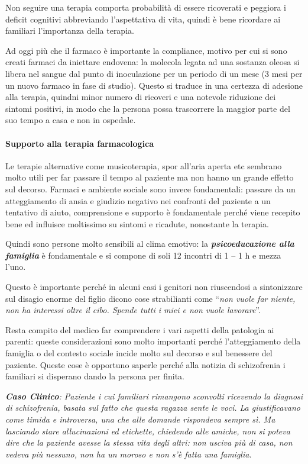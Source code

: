 Non seguire una terapia comporta probabilità di essere ricoverati e
peggiora i deficit cognitivi abbreviando l'aspettativa di vita, quindi è
bene ricordare ai familiari l'importanza della terapia.

Ad oggi più che il farmaco è importante la compliance, motivo per cui si
sono creati farmaci da iniettare endovena: la molecola legata ad una
sostanza oleosa si libera nel sangue dal punto di inoculazione per un
periodo di un mese (3 mesi per un nuovo farmaco in fase di studio).
Questo si traduce in una certezza di adesione alla terapia, quindni
minor numero di ricoveri e una notevole riduzione dei sintomi positivi,
in modo che la persona possa trascorrere la maggior parte del suo tempo
a casa e non in ospedale.

\paragraph{Supporto alla terapia farmacologica}

Le terapie alternative come musicoterapia, spor all'aria aperta etc
sembrano molto utili per far passare il tempo al paziente ma non hanno
un grande effetto sul decorso. Farmaci e ambiente sociale sono invece
fondamentali: passare da un atteggiamento di ansia e giudizio negativo
nei confronti del paziente a un tentativo di aiuto, comprensione e
supporto è fondamentale perché viene recepito bene ed influisce
moltissimo su sintomi e ricadute, nonostante la terapia.

Quindi sono persone molto sensibili al clima emotivo: la
\textbf{\emph{psicoeducazione alla famiglia}} è fondamentale e si
compone di soli 12 incontri di 1 -- 1 h e mezza l'uno.

Questo è importante perché in alcuni casi i genitori non riuscendosi a
sintonizzare sul disagio enorme del figlio dicono cose strabilianti come
``\emph{non vuole far niente, non ha interessi oltre il cibo. Spende
tutti i miei e non vuole lavorare}''.

Resta compito del medico far comprendere i vari aspetti della patologia
ai parenti: queste considerazioni sono molto importanti perché
l'atteggiamento della famiglia o del contesto sociale incide molto sul
decorso e sul benessere del paziente. Queste cose è opportuno saperle
perché alla notizia di schizofrenia i familiari si disperano dando la
persona per finita.

\emph{\textbf{Caso Clinico}: Paziente i cui familiari rimangono
sconvolti ricevendo la diagnosi di schizofrenia, basata sul fatto che
questa ragazza sente le voci. La giustificavano come timida e
introversa, una che alle domande rispondeva sempre sì. Ma lasciando
stare allucinazioni ed etichette, chiedendo alle amiche, non si poteva
dire che la paziente avesse la stessa vita degli altri: non usciva più
di casa, non vedeva più nessuno, non ha un moroso e non s'è fatta una
famiglia}.

